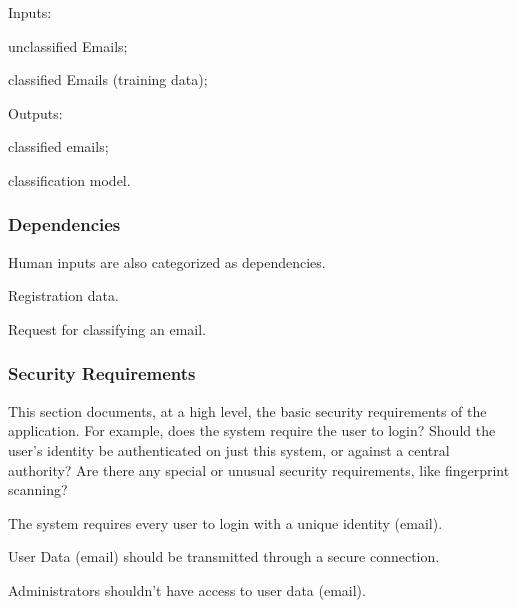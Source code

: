 \begin{my_enumerate}
  \item Inputs:
  \begin{my_itemize}
    \item unclassified Emails;
    \item classified Emails (training data);
  \end{my_itemize}
  \item Outputs:
  \begin{my_itemize}
    \item classified emails;
    \item classification model.
  \end{my_itemize}
\end{my_enumerate}


\subsubsection{Dependencies}
Human inputs are also categorized as dependencies.
\begin{my_enumerate}
  \item Registration data.
  \item Request for classifying an email.
\end{my_enumerate}


\subsubsection{Security Requirements}
This section documents, at a high level, the basic security requirements of the 
application. For example, does the system require the user to login?  Should the 
user’s identity be authenticated on just this system, or against a central authority?  
Are there any special or unusual security requirements, like fingerprint scanning?

\begin{my_enumerate}
  \item The system requires every user to login with a unique identity (email).
  \item User Data (email) should be transmitted through a secure connection.
  \item Administrators shouldn’t have access to user data (email).
\end{my_enumerate}



